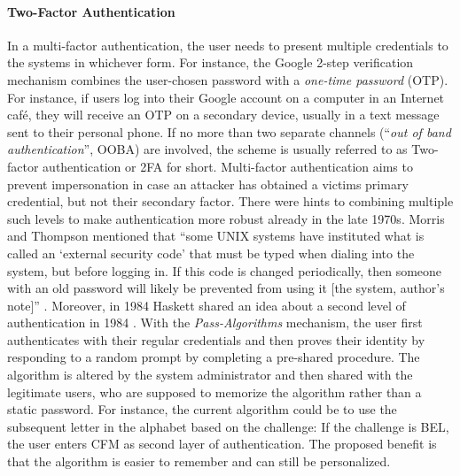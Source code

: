 	\paragraph{Two-Factor Authentication}
	In a multi-factor authentication, the user needs to present multiple credentials to the systems in whichever form. For instance, the Google 2-step verification mechanism combines the user-chosen password with a \textit{one-time password} (OTP). For instance, if users log into their Google account on a computer in an Internet café, they will receive an OTP on a secondary device, usually in a text message sent to their personal phone. If no more than two separate channels (``\textit{out of band authentication}'', OOBA) are involved, the scheme is usually referred to as Two-factor authentication or 2FA for short. Multi-factor authentication aims to prevent impersonation in case an attacker has obtained a victims primary credential, but not their secondary factor. 
	There were hints to combining multiple such levels to make authentication more robust already in the late 1970s. Morris and Thompson mentioned that ``some UNIX systems have instituted what is called an `external security code' that must be typed when dialing into the system, but before logging in. If this code is changed periodically, then someone with an old password will likely be prevented from using it [the system, author's note]'' \cite{Morris1979PasswordSecurity}. Moreover, in 1984 Haskett shared an idea about a second level of authentication in 1984 \cite{Haskett1984PassAlgorithms}. With the \textit{Pass-Algorithms} mechanism, the user first authenticates with their regular credentials and then proves their identity by responding to a random prompt by completing a pre-shared procedure. The algorithm is altered by the system administrator and then shared with the legitimate users, who are supposed to memorize the algorithm rather than a static password. For instance, the current algorithm could be to use the subsequent letter in the alphabet based on the challenge: If the challenge is BEL, the user enters CFM as second layer of authentication. The proposed benefit is that the algorithm is easier to remember and can still be personalized. 
